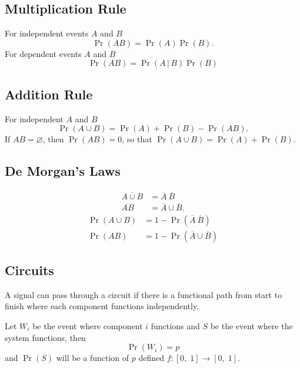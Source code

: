 \documentclass{article}
\begin{document}
\begin{multicols}{3}
    \subsection{Multiplication Rule}
    For independent events \(A\) and \(B\)
    \begin{equation*}
        \Pr{\left( AB \right)} = \Pr{\left( A \right)} \Pr{\left( B \right)}.
    \end{equation*}
    For dependent events \(A\) and \(B\)
    \begin{equation*}
        \Pr{\left( AB \right)} = \Pr{\left( A \,\vert \, B \right)} \Pr{\left( B \right)}
    \end{equation*}
    \subsection{Addition Rule}
    For independent \(A\) and \(B\)
    \begin{equation*}
        \Pr{\left( A \cup B \right)} = \Pr{\left( A \right)} + \Pr{\left( B \right)} - \Pr{\left( AB \right)}.
    \end{equation*}
    If \(AB = \varnothing \), then \(\Pr{\left( AB \right)} = 0\), so that \(\Pr{\left( A \cup B \right)} = \Pr{\left( A \right)} + \Pr{\left( B \right)}\).
    \subsection{De Morgan's Laws}
    \begin{align*}
        \overline{A \cup B} & = \overline{A} \ \overline{B}     \\
        \overline{AB}       & = \overline{A} \cup \overline{B}.
    \end{align*}
    \begin{align*}
        \Pr{\left( A \cup B \right)} & = 1 - \Pr{\left( \overline{A} \ \overline{B} \right)}    \\
        \Pr{\left( AB \right)}       & = 1 - \Pr{\left( \overline{A} \cup \overline{B} \right)}
    \end{align*}
    \subsection{Circuits}
    A signal can pass through a circuit if there is a functional path from start to finish where
    each component functions independently.

    Let \(W_i\) be the event where component \(i\) functions
    and \(S\) be the event where the system functions, then
    \begin{equation*}
        \Pr{\left( W_i \right)} = p
    \end{equation*}
    and \(\Pr{\left( S \right)}\) will be a function of \(p\) defined \(f:\left[ 0,\; 1 \right] \to \left[ 0,\; 1 \right]\).

\end{multicols}
\end{document}
